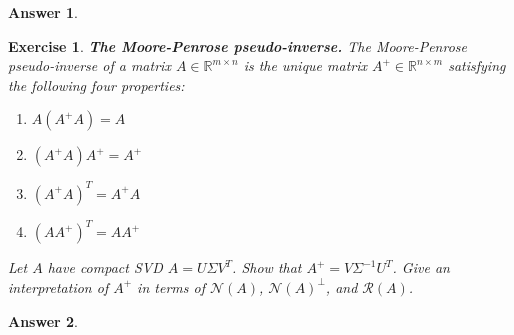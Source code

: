 \documentclass[12pt]{article}
\theoremstyle{colon}
\newtheorem{exercise}{Exercise}
\newtheorem*{answer}{Answer}
\begin{document}
\begin{answer}
\end{answer}

\clearpage

\begin{exercise}
  \textbf{The Moore-Penrose pseudo-inverse.} The Moore-Penrose pseudo-inverse of a matrix $A \in \mathbb{R}^{m \times n}$ is the unique matrix $A^+ \in \mathbb{R}^{n \times m}$ satisfying the following four properties:

  \begin{enumerate}[label=\alph*)]
    \item $A(A^+ A) = A$
    \item $(A^+ A)A^+ = A^+$
    \item $(A^+ A)^T = A^+ A$
    \item $(A A^+)^T = A A^+$
  \end{enumerate}

  Let $A$ have compact SVD $A = U \Sigma V^T$. Show that $A^+ = V \Sigma^{-1} U^T$. Give an interpretation of $A^+$ in terms of $\mathcal{N}(A)$, $\mathcal{N}(A)^\perp$, and $\mathcal{R}(A)$.
\end{exercise}

\begin{answer}
\end{answer}
\end{document}
